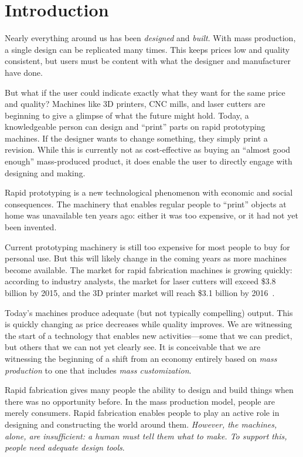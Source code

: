 \chapter{Introduction}

Nearly everything around us has been \textit{designed} and
\textit{built}. With mass production, a single design can be
replicated many times. This keeps prices low and quality consistent,
but users must be content with what the designer and manufacturer have
done.

But what if the user could indicate exactly what they want for the
same price and quality? Machines like 3D printers, CNC mills, and
laser cutters are beginning to give a glimpse of what the future might
hold. Today, a knowledgeable person can design and ``print'' parts on
rapid prototyping machines. If the designer wants to change something,
they simply print a revision. While this is currently not as
cost-effective as buying an ``almost good enough'' mass-produced
product, it does enable the user to directly engage with designing and
making.

Rapid prototyping is a new technological phenomenon with economic and
social consequences. The machinery that enables regular people to
``print'' objects at home was unavailable ten years ago: either it was
too expensive, or it had not yet been invented. 

Current prototyping machinery is still too expensive for most people
to buy for personal use. But this will likely change in the coming
years as more machines become available. The market for rapid
fabrication machines is growing quickly: according to industry
analysts, the market for laser cutters will exceed \$3.8 billion by
2015, and the 3D printer market will reach \$3.1 billion by
2016~\cite{laser-cutter-market,3d-printer-market}.

Today's machines produce adequate (but not typically compelling)
output. This is quickly changing as price decreases while quality
improves. We are witnessing the start of a technology that enables new
activities---some that we can predict, but others that we can not yet
clearly see. It is conceivable that we are witnessing the beginning of
a shift from an economy entirely based on \textit{mass production} to
one that includes \textit{mass customization}.

Rapid fabrication gives many people the ability to design and build
things when there was no opportunity before. In the mass production
model, people are merely consumers. Rapid fabrication enables people
to play an active role in designing and constructing the world around
them. \textit{However, the machines, alone, are insufficient: a human
  must tell them what to make. To support this, people need adequate
  design tools}.

